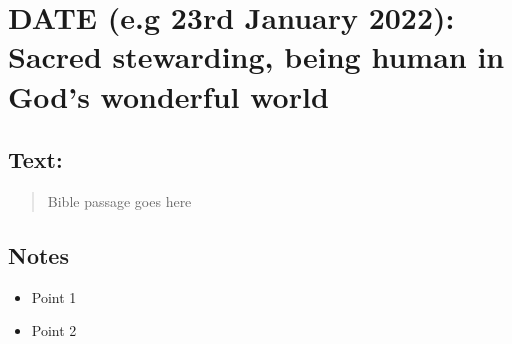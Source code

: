 \setcounter{figure}{0}

\section{DATE (e.g 23rd January 2022): Sacred stewarding, being human in God's wonderful world}
\subsection*{Text: }
  \begin{quote}
    Bible passage goes here
  \end{quote}
\subsection*{Notes}
\begin{itemize}
  \item{Point 1}
  \item{Point 2}
\end{itemize}